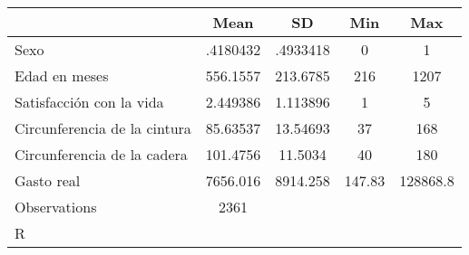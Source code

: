 {
\def\sym#1{\ifmmode^{#1}\else\(^{#1}\)\fi}
\begin{tabular}{l*{1}{cccc}}
\hline\hline
                    &        Mean&          SD&         Min&         Max\\
\hline
Sexo                &    .4180432&    .4933418&           0&           1\\
Edad en meses       &    556.1557&    213.6785&         216&        1207\\
Satisfacción con la vida&    2.449386&    1.113896&           1&           5\\
Circunferencia de la cintura&    85.63537&    13.54693&          37&         168\\
Circunferencia de la cadera&    101.4756&     11.5034&          40&         180\\
Gasto real          &    7656.016&    8914.258&      147.83&    128868.8\\
\hline
Observations        &        2361&            &            &            \\
\hline\hline
\multicolumn{5}{l}{\footnotesize R}\\
\end{tabular}
}
